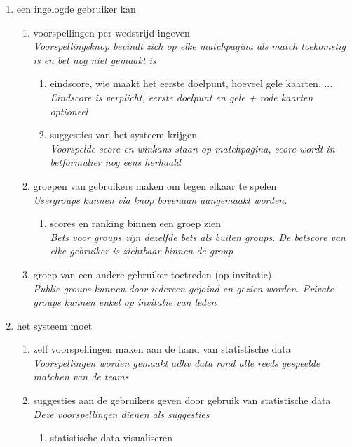 \documentclass[11pt, a4paper]{article}
\begin{document}
\begin{enumerate}
 \item een ingelogde gebruiker kan
 \begin{enumerate}
 \item voorspellingen per wedstrijd ingeven \\
 \textit{Voorspellingsknop bevindt zich op elke matchpagina als match toekomstig is en bet nog niet gemaakt is}
 \begin{enumerate}
 \item eindscore, wie maakt het eerste doelpunt, hoeveel gele kaarten, ... \\
 \textit{Eindscore is verplicht, eerste doelpunt en gele + rode kaarten optioneel}
 \item suggesties van het systeem krijgen \\
 \textit{Voorspelde score en winkans staan op matchpagina, score wordt in betformulier nog eens herhaald}
 \end{enumerate}
 \item groepen van gebruikers maken om tegen elkaar te spelen \\
 \textit{Usergroups kunnen via knop bovenaan aangemaakt worden.}
 \begin{enumerate}
 \item scores en ranking binnen een groep zien \\
 \textit{Bets voor groups zijn dezelfde bets als buiten groups. De betscore van elke gebruiker is zichtbaar binnen de group}
 \end{enumerate}
 \item groep van een andere gebruiker toetreden (op invitatie) \\
 \textit{Public groups kunnen door iedereen gejoind en gezien worden. Private groups kunnen enkel op invitatie van leden}
 \end{enumerate}
 \item het systeem moet
 \begin{enumerate}
 \item zelf voorspellingen maken aan de hand van statistische data \\
 \textit{Voorspellingen worden gemaakt adhv data rond alle reeds gespeelde matchen van de teams}
 \item suggesties aan de gebruikers geven door gebruik van statistische data \\
 \textit{Deze voorspellingen dienen als suggesties}
 \begin{enumerate}
 \item statistische data visualiseren \\

\end{enumerate}
\end{enumerate}
\end{enumerate}
\end{document}
